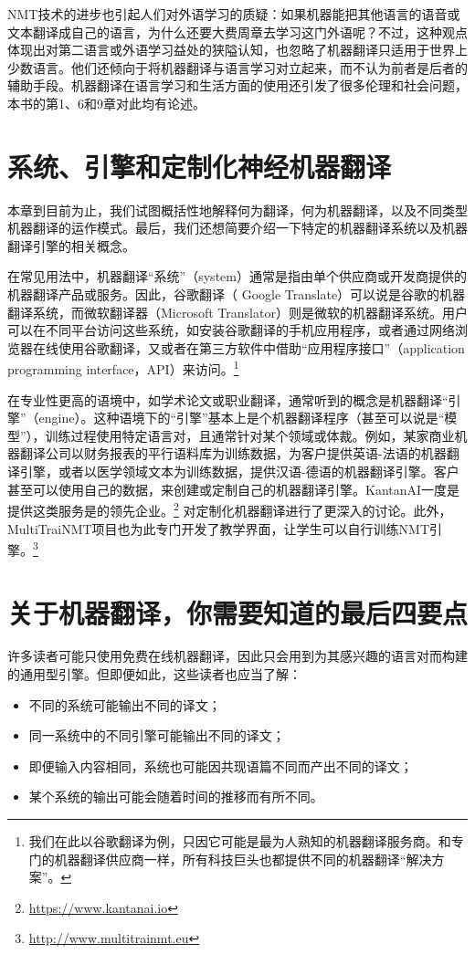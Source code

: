 \documentclass[output=paper]{langscibook}
\begin{document}
NMT技术的进步也引起人们对外语学习的质疑：如果机器能把其他语言的语音或文本翻译成自己的语言，为什么还要大费周章去学习这门外语呢？不过，这种观点体现出对第二语言或外语学习益处的狭隘认知，也忽略了机器翻译只适用于世界上少数语言。他们还倾向于将机器翻译与语言学习对立起来，而不认为前者是后者的辅助手段。机器翻译在语言学习和生活方面的使用还引发了很多伦理和社会问题，本书的第1、6和9章对此均有论述。


\section{系统、引擎和定制化神经机器翻译}
本章到目前为止，我们试图概括性地解释何为翻译，何为机器翻译，以及不同类型机器翻译的运作模式。最后，我们还想简要介绍一下特定的机器翻译系统以及机器翻译引擎的相关概念。

在常见用法中，机器翻译“系统”（system）通常是指由单个供应商或开发商提供的机器翻译产品或服务。因此，谷歌翻译（ Google Translate）可以说是谷歌的机器翻译系统，而微软翻译器（Microsoft Translator）则是微软的机器翻译系统。用户可以在不同平台访问这些系统，如安装谷歌翻译的手机应用程序，或者通过网络浏览器在线使用谷歌翻译，又或者在第三方软件中借助“应用程序接口”（application programming interface，API）来访问。\footnote{我们在此以谷歌翻译为例，只因它可能是最为人熟知的机器翻译服务商。和专门的机器翻译供应商一样，所有科技巨头也都提供不同的机器翻译“解决方案”。}  

在专业性更高的语境中，如学术论文或职业翻译，通常听到的概念是机器翻译“引擎”（engine）。这种语境下的“引擎”基本上是个机器翻译程序（甚至可以说是“模型”），训练过程使用特定语言对，且通常针对某个领域或体裁。例如，某家商业机器翻译公司以财务报表的平行语料库为训练数据，为客户提供英语-法语的机器翻译引擎，或者以医学领域文本为训练数据，提供汉语-德语的机器翻译引擎。客户甚至可以使用自己的数据，来创建或定制自己的机器翻译引擎。KantanAI一度是提供这类服务是的领先企业。\footnote{\url{https://www.kantanai.io}} 对定制化机器翻译进行了更深入的讨论。此外，MultiTraiNMT项目也为此专门开发了教学界面，让学生可以自行训练NMT引擎。\footnote{\url{http://www.multitrainmt.eu}}


\section {关于机器翻译，你需要知道的最后四要点}
许多读者可能只使用免费在线机器翻译，因此只会用到为其感兴趣的语言对而构建的通用型引擎。但即便如此，这些读者也应当了解：

\begin{itemize}
    \item 不同的系统可能输出不同的译文；
    \item 同一系统中的不同引擎可能输出不同的译文；
    \item 即便输入内容相同，系统也可能因共现语篇不同而产出不同的译文；
    \item 某个系统的输出可能会随着时间的推移而有所不同。
\end{itemize}
\end{document}
